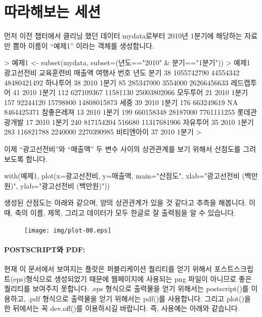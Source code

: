 \documentclass[../tutorial.tex]{subfiles}
\begin{document}
\section{따라해보는 세션}
먼저 이전 챕터에서 클리닝 했던 데이터 mydata로부터 2010년 1분기에 해당하는 자료만 뽑아 이름이 ``예제1'' 이라는 객체를 생성합니다.

\begin{Schunk}
\begin{Soutput}	
> 예제1 <- subset(mydata, subset=(년도=="2010" & 분기=="1분기"))
> 예제1 
    광고선전비 교육훈련비      매출액       여행사 번호 년도  분기
38  1055742790   44554342 48480421492     하나투어   38 2010 1분기
85   285347000    3554000 26266456633   레드캡투어   41 2010 1분기
112  627109367   11581130 25003802066     모두투어   21 2010 1분기
157   92244120   15798800 14808015873         세중   39 2010 1분기
176  663249619         NA  8464425371   참좋은레져   13 2010 1분기
199  660158348   28187000  7761111255 롯데관광개발   17 2010 1분기
240  817154204     516680 11317681906     자유투어   35 2010 1분기
283  116821788    2240000  2270390985   비티앤아이   37 2010 1분기
>
\end{Soutput}
\end{Schunk}

이제 ``광고선전비''와 ``매출액'' 두 변수 사이의 상관관계를 보기 위해서 산점도를 그려보도록 합니다.

\begin{Schunk}
\begin{Soutput}	
with(예제1, plot(x=광고선전비, y=매출액, main="산점도", xlab="광고선전비 (백만원)", ylab="광고선전비 (백만원)"))
\end{Soutput}
\end{Schunk}

생성된 산점도는 아래와 같으며, 양의 상관관계가 있을 것 같다고 추측을 해봅니다.
이때, 축의 이름, 제목, 그리고 데이터가 모두 한글로 잘 출력됨을 알 수 있습니다.

\begin{figure}
\begin{center}
\texttt{[image: img/plot-00.eps]}
\end{center}
\end{figure}

\paragraph{POSTSCRIPT와 PDF:} 현재 이 문서에서 보여지는 플랏은 퍼블리케이션 퀄리티를 얻기 위해서 포스트스크립트(eps)형식으로 생성되었기 때문에 웹페이지에 사용되는 png 파일이 아니므로 좋은 퀄리티를 보여주지 못합니다.
.eps 형식으로 출력물을 얻기 위해서는 postscript()를 이용하고, .pdf 형식으로 출력물을 얻기 위해서는 pdf()를 사용합니다. 
그리고 plot()을 한 뒤에서는 꼭 dev.off()를 이용하시길 바랍니다. 
즉, 사용예는 아래와 같습니다. 
\end{document}
